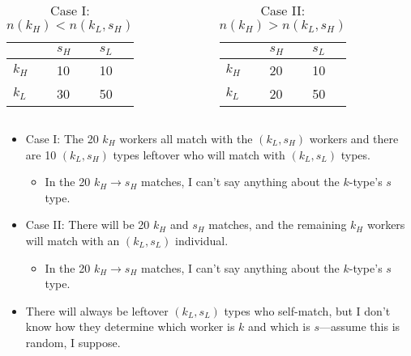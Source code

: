 \documentclass[aspectratio=169]{beamer}
\begin{document}
\begin{frame}
	    \begin{columns}
		\begin{column}{0.4\textwidth}
			\begin{table}
		\begin{tabular}{l|ll}
	& $s_H$ & $s_L$ \\ \hline
	$k_H$ & 10    & 10    \\
	$k_L$ & 30    & 50   
\end{tabular}
				\caption*{Case I: $n(k_H) < n(k_L,s_H)$}
			\end{table}
		\end{column}
		\begin{column}{0.4\textwidth}
			\begin{table}
		\begin{tabular}{l|ll}
	& $s_H$ & $s_L$ \\ \hline
	$k_H$ & 20    & 10    \\
	$k_L$ & 20    & 50 
\end{tabular}
\caption*{Case II: $n(k_H) > n(k_L,s_H)$}
			\end{table}
		\end{column}
	\end{columns}
		\begin{itemize}
		\item Case I: The 20 $k_H$ workers all match with the $(k_L,s_H)$ workers and there are 10 $(k_L,s_H)$ types leftover who will match with $(k_L,s_L)$ types. 
		\begin{itemize}
			\item In the 20 $k_H \to s_H$ matches, I can't say anything about the $k$-type's $s$ type.
		\end{itemize}
		\item Case II: There will be 20 $k_H$ and $s_H$ matches, and the remaining $k_H$ workers will match with an $(k_L,s_L)$ individual.
		\begin{itemize}
			\item In the 20 $k_H \to s_H$ matches, I can't say anything about the $k$-type's $s$ type.
		\end{itemize}
		\item There will always be leftover $(k_L,s_L)$ types who self-match, but I don't know how they determine which worker is $k$ and which is $s$---assume this is random, I suppose.
	\end{itemize}
\end{frame}
\end{document}

